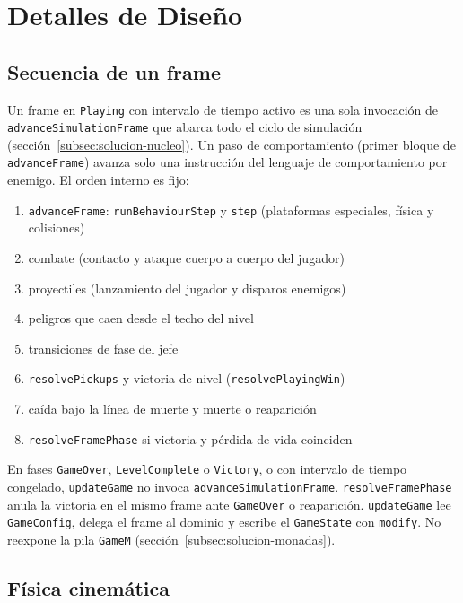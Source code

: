 \section{Detalles de Diseño}
\label{sec:detalles-diseno}

\subsection{Secuencia de un frame}
\label{subsec:pipeline-frame}

Un frame en \texttt{Playing} con intervalo de tiempo activo es una sola
invocación de \texttt{advanceSimulation\-Frame} que abarca todo el ciclo de simulación
(sección~\ref{subsec:solucion-nucleo}). Un paso de comportamiento (primer bloque de
\texttt{advanceFrame}) avanza solo una instrucción del lenguaje de comportamiento por
enemigo. El orden interno es fijo:

\begin{enumerate}
  \item \texttt{advanceFrame}: \texttt{runBehaviourStep} y \texttt{step}
    (plataformas especiales, física y colisiones)
  \item combate (contacto y ataque cuerpo a cuerpo del jugador)
  \item proyectiles (lanzamiento del jugador y disparos enemigos)
  \item peligros que caen desde el techo del nivel
  \item transiciones de fase del jefe
  \item \texttt{resolvePickups} y victoria de nivel (\texttt{resolvePlayingWin})
  \item caída bajo la línea de muerte y muerte o reaparición
  \item \texttt{resolveFramePhase} si victoria y pérdida de vida coinciden
\end{enumerate}

En fases \texttt{GameOver}, \texttt{LevelComplete} o \texttt{Victory}, o con
intervalo de tiempo congelado, \texttt{updateGame} no invoca
\texttt{advanceSimulation\-Frame}. \texttt{resolveFramePhase} anula la victoria en
el mismo frame ante \texttt{GameOver} o reaparición.
\texttt{updateGame} lee \texttt{GameConfig}, delega el frame al dominio y escribe
el \texttt{GameState} con \texttt{modify}. No reexpone la pila \texttt{GameM}
(sección~\ref{subsec:solucion-monadas}).

\subsection{Física cinemática}
\label{subsec:fisica}

